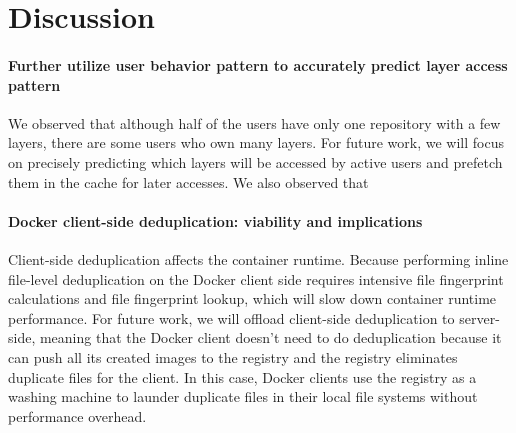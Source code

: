\section{Discussion}
\label{sec:discussion}

\paragraph{Further utilize user behavior pattern to accurately predict layer access pattern}
We observed that although half of the users have only one repository with a few layers, there are some users who own many layers. 
For future work, we will focus on precisely predicting which layers will be accessed by active users and prefetch them in the cache for later accesses.
We also observed that 

\paragraph{Docker client-side deduplication: viability and implications}
Client-side deduplication affects the container runtime. 
Because performing inline file-level deduplication on the Docker client side requires intensive file 
fingerprint calculations and file fingerprint lookup, which will slow down container runtime performance.
For future work, we will offload client-side deduplication to server-side, meaning that the 
Docker client doesn't need to do deduplication because
it can push all its created images to the registry and the registry eliminates duplicate files for the client. 
In this case, Docker clients use the registry as a washing machine to launder duplicate files in their local file systems without performance overhead.


